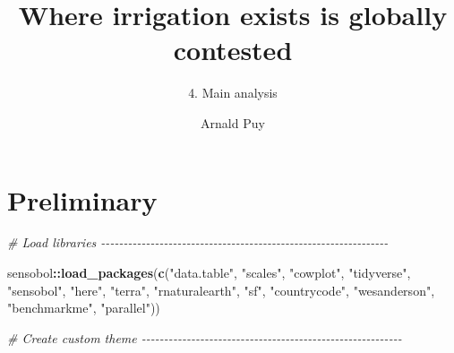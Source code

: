\documentclass[
  11pt,
]{article}
\title{Where irrigation exists is globally contested}
\subtitle{4. Main analysis}
\author{Arnald Puy}
\date{}
\newenvironment{Shaded}{\begin{snugshade}}{\end{snugshade}}
\newcommand{\CommentTok}[1]{\textcolor[rgb]{0.56,0.35,0.01}{\textit{#1}}}
\newcommand{\FunctionTok}[1]{\textcolor[rgb]{0.13,0.29,0.53}{\textbf{#1}}}
\newcommand{\NormalTok}[1]{#1}
\newcommand{\SpecialCharTok}[1]{\textcolor[rgb]{0.81,0.36,0.00}{\textbf{#1}}}
\newcommand{\StringTok}[1]{\textcolor[rgb]{0.31,0.60,0.02}{#1}}
\begin{document}
\maketitle

{
\setcounter{tocdepth}{2}
\tableofcontents
}
\newpage

\section{Preliminary}\label{preliminary}

\begin{Shaded}
\begin{Highlighting}[]
\CommentTok{\# Load libraries {-}{-}{-}{-}{-}{-}{-}{-}{-}{-}{-}{-}{-}{-}{-}{-}{-}{-}{-}{-}{-}{-}{-}{-}{-}{-}{-}{-}{-}{-}{-}{-}{-}{-}{-}{-}{-}{-}{-}{-}{-}{-}{-}{-}{-}{-}{-}{-}{-}{-}{-}{-}{-}{-}{-}{-}{-}{-}{-}{-}{-}{-}{-}{-}}

\NormalTok{sensobol}\SpecialCharTok{::}\FunctionTok{load\_packages}\NormalTok{(}\FunctionTok{c}\NormalTok{(}\StringTok{"data.table"}\NormalTok{, }\StringTok{"scales"}\NormalTok{, }\StringTok{"cowplot"}\NormalTok{, }\StringTok{"tidyverse"}\NormalTok{, }\StringTok{"sensobol"}\NormalTok{,}
                          \StringTok{"here"}\NormalTok{, }\StringTok{"terra"}\NormalTok{, }\StringTok{"rnaturalearth"}\NormalTok{, }\StringTok{"sf"}\NormalTok{, }\StringTok{"countrycode"}\NormalTok{, }
                          \StringTok{"wesanderson"}\NormalTok{, }\StringTok{"benchmarkme"}\NormalTok{, }\StringTok{"parallel"}\NormalTok{))}

\CommentTok{\# Create custom theme {-}{-}{-}{-}{-}{-}{-}{-}{-}{-}{-}{-}{-}{-}{-}{-}{-}{-}{-}{-}{-}{-}{-}{-}{-}{-}{-}{-}{-}{-}{-}{-}{-}{-}{-}{-}{-}{-}{-}{-}{-}{-}{-}{-}{-}{-}{-}{-}{-}{-}{-}{-}{-}{-}{-}{-}{-}{-}}


\end{Highlighting}
\end{Shaded}
\end{document}
